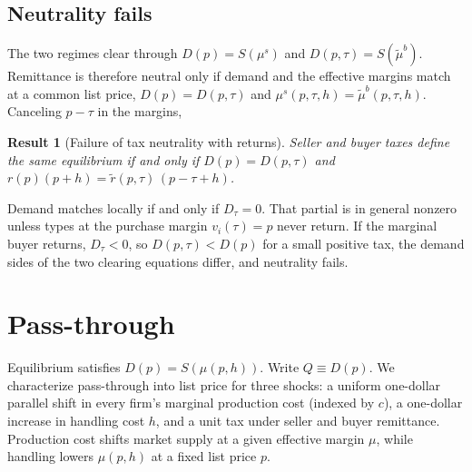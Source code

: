 \documentclass[11pt]{article}
\newtheorem{result}{Result}
\begin{document}
\subsection{Neutrality fails}

The two regimes clear through $D(p)=S(\mu^{s})$ and
$D(p,\tau)=S(\tilde{\mu}^{b})$.  Remittance is therefore neutral only if
demand and the effective margins match at a common list price,
$D(p)=D(p,\tau)$ and $\mu^{s}(p,\tau,h)=\tilde{\mu}^{b}(p,\tau,h)$.
Canceling $p-\tau$ in the margins,
\begin{result}[Failure of tax neutrality with returns]
  Seller and buyer taxes define the same equilibrium if and only if
  $D(p)=D(p,\tau)$ and
  $r(p)(p+h)=\tilde{r}(p,\tau)\,(p-\tau+h)$.
\end{result}
Demand matches locally if and only if $D_{\tau}=0$.  That partial is in
general nonzero unless types at the purchase margin $v_i(\tau)=p$ never
return.  If the marginal buyer returns, $D_{\tau}<0$, so
$D(p,\tau)<D(p)$ for a small positive tax, the demand sides of the two
clearing equations differ, and neutrality fails.

\section{Pass-through}

Equilibrium satisfies $D(p)=S(\mu(p,h))$.  Write $Q\equiv D(p)$.  We
characterize pass-through into list price for three shocks: a uniform
one-dollar parallel shift in every firm's marginal production cost (indexed by
$c$), a one-dollar increase in handling cost $h$, and a unit tax under seller
and buyer remittance.  Production cost shifts market supply at a given
effective margin $\mu$, while handling lowers $\mu(p,h)$ at a fixed list
price $p$.
\end{document}
